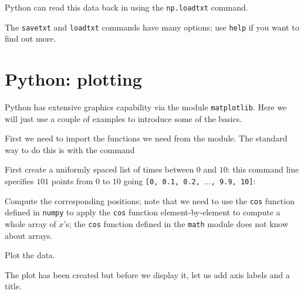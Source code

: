 \vspace{5mm}
\noindent
Python can read this data back in using the \texttt{np.loadtxt}
command.


\noindent
The \texttt{savetxt} and \texttt{loadtxt} commands have many options; use
\texttt{help} if you want to find out more.


\section{Python: plotting}

Python has extensive graphics capability via the module
\texttt{matplotlib}. Here we will just use a couple of examples to
introduce some of the basics.

First we need to import the functions we need from the module. The
standard way to do this is with the command



\noindent
First create a uniformly spaced list of times between $0$ and $10$: 
this command line 
specifies $101$ points from $0$ to $10$ going \texttt{[0, 0.1, 0.2, $\ldots$, 9.9, 10]}: 


\noindent
Compute the corresponding positions; note that we need to use the
\texttt{cos} function defined in \texttt{numpy} to apply the
\texttt{cos} function element-by-element to compute a whole array of
$x$'s; the \texttt{cos} function defined in the \texttt{math} module
does not know about arrays.


\noindent
Plot the data.


\noindent
The plot has been created but before we display it, let us add axis
labels and a title.




